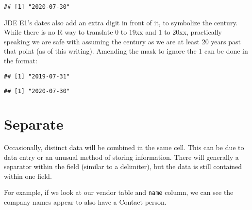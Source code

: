 \documentclass[
]{book}
\newenvironment{Shaded}{\begin{snugshade}}{\end{snugshade}}
\newcommand{\DataTypeTok}[1]{\textcolor[rgb]{0.13,0.29,0.53}{#1}}
\newcommand{\KeywordTok}[1]{\textcolor[rgb]{0.13,0.29,0.53}{\textbf{#1}}}
\newcommand{\NormalTok}[1]{#1}
\newcommand{\OperatorTok}[1]{\textcolor[rgb]{0.81,0.36,0.00}{\textbf{#1}}}
\newcommand{\StringTok}[1]{\textcolor[rgb]{0.31,0.60,0.02}{#1}}
\begin{document}
\begin{verbatim}
## [1] "2020-07-30"
\end{verbatim}

JDE E1's dates also add an extra digit in front of it, to symbolize the century. While there is no R way to translate 0 to 19xx and 1 to 20xx, practically speaking we are safe with assuming the century as we are at least 20 years past that point (as of this writing). Amending the mask to ignore the 1 can be done in the format:

\begin{Shaded}
\end{Shaded}

\begin{verbatim}
## [1] "2019-07-31"
\end{verbatim}

\begin{Shaded}
\end{Shaded}

\begin{verbatim}
## [1] "2020-07-30"
\end{verbatim}

\hypertarget{separate}{%
\section{Separate}\label{separate}}

Occasionally, distinct data will be combined in the same cell. This can be due to data entry or an unusual method of storing information. There will generally a separator within the field (similar to a delimiter), but the data is still contained within one field.

For example, if we look at our vendor table and \texttt{name} column, we can see the company names appear to also have a Contact person.

\begin{Shaded}
\end{Shaded}
\end{document}

